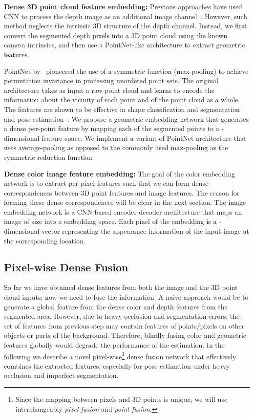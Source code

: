 \documentclass[10pt,twocolumn,letterpaper]{article}
\begin{document}
\noindent\textbf{Dense 3D point cloud feature embedding:}
Previous approaches have used CNN to process the depth image as an additional image channel~\cite{li2018unified}. However, such method neglects the intrinsic 3D structure of the depth channel. Instead, we first convert the segmented depth pixels into a 3D point cloud using the known camera intrinsics, and then use a PointNet-like architecture to extract geometric features. 

PointNet by~\citet{qi2016pointnet} pioneered the use of a symmetric function (max-pooling) to achieve permutation invariance in processing unordered point sets. The original architecture takes as input a raw point cloud and learns to encode the information about the vicinity of each point and of the point cloud as a whole. The features are shown to be effective in shape classification and segmentation~\cite{qi2016pointnet} and pose estimation~\cite{xu2017pointfusion,qi2017frustum}. We propose a geometric embedding network that generates a dense per-point feature by mapping each of the  segmented points to a -dimensional feature space. We implement a variant of PointNet architecture that uses average-pooling as opposed to the commonly used max-pooling as the symmetric reduction function.

\noindent\textbf{Dense color image feature embedding:}
The goal of the color embedding network is to extract per-pixel features such that we can form dense correspondences between 3D point features and image features. The reason for forming these dense correspondences will be clear in the next section. The image embedding network is a CNN-based encoder-decoder architecture that maps an image of size  into a  embedding space. Each pixel of the embedding is a -dimensional vector representing the appearance information of the input image at the corresponding location.

\subsection{Pixel-wise Dense Fusion}
\label{ssec:pwdf}

So far we have obtained dense features from both the image and the 3D point cloud inputs; now we need to fuse the information. A naive approach would be to generate a global feature from the dense color and depth features from the segmented area. However, due to heavy occlusion and segmentation errors, the set of features from previous step may contain features of points/pixels on other objects or parts of the background. Therefore, blindly fusing color and geometric features globally would degrade the performance of the estimation. In the following we describe a novel pixel-wise\footnote{Since the mapping between pixels and 3D points is unique, we will use interchangeably \emph{pixel-fusion} and \emph{point-fusion}.} dense fusion network that effectively combines the extracted features, especially for pose estimation under heavy occlusion and imperfect segmentation.
\end{document}
